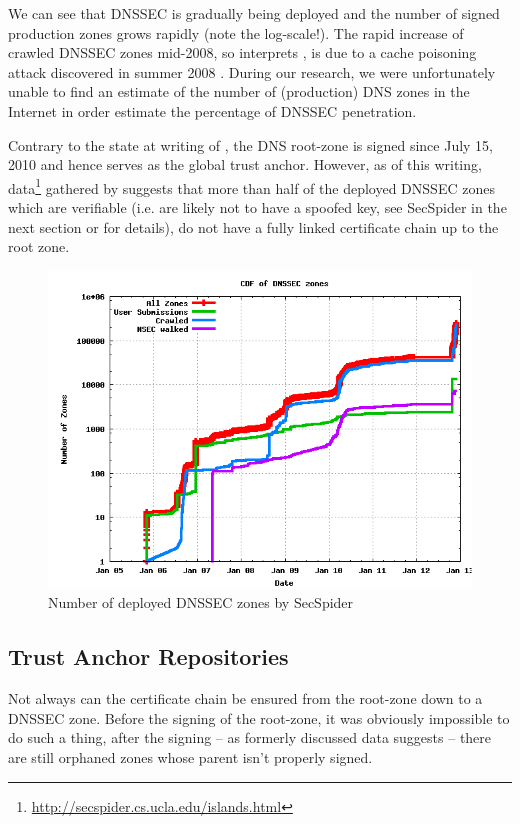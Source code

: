 \documentclass[a4paper,twocolumn]{scrartcl}
\begin{document}
We can see that DNSSEC is gradually being deployed and the number of
signed production zones grows rapidly (note the log-scale!). The rapid
increase of crawled DNSSEC zones mid-2008, so interprets
\cite{Osterweil09}, is due to a cache poisoning attack discovered in
summer 2008 \cite{dnsVuln}. During our research, we were unfortunately
unable to find an estimate of the number of (production) DNS zones in
the Internet in order estimate the percentage of DNSSEC penetration.

Contrary to the state at writing of \cite{Osterweil09}, the DNS
root-zone is signed since July 15, 2010 \cite{root-dnssec} and hence
serves as the global trust anchor. However, as of this writing,
data\footnote{\url{http://secspider.cs.ucla.edu/islands.html}}
gathered by \cite{secspider} suggests that more than half of the
deployed DNSSEC zones which are verifiable (i.e. are likely not to
have a spoofed key, see SecSpider in the next section or
\cite{Osterweil09} for details), do not have a fully linked
certificate chain up to the root zone.

\begin{figure}
  \includegraphics[width=\linewidth]{dnssec-growth}
  \caption{Number of deployed DNSSEC zones by
    SecSpider \cite{secspider}}
  \label{fig:dnssec-growth}
\end{figure}

\subsection{Trust Anchor Repositories}
Not always can the certificate chain be ensured from the root-zone
down to a DNSSEC zone. Before the signing of the root-zone, it was
obviously impossible to do such a thing, after the signing -- as
formerly discussed data suggests -- there are still orphaned zones
whose parent isn't properly signed.
\end{document}
